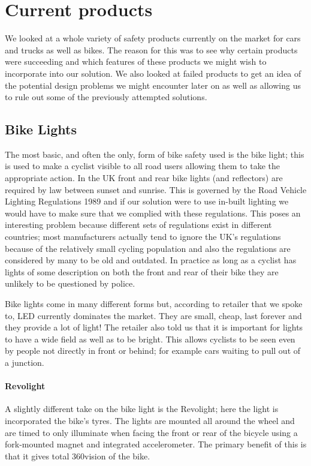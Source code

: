 \documentclass[a4paper]{report}
\begin{document}
{\section{Current products}
We looked at a whole variety of safety products currently on the market for cars and trucks as well as bikes. The reason for this was to see why certain products were succeeding and which features of these products we might wish to incorporate into our solution. We also looked at failed products to get an idea of the potential design problems we might encounter later on as well as allowing us to rule out some of the previously attempted solutions.
\subsection{Bike Lights}
The most basic, and often the only, form of bike safety used is the bike light; this is used to make a cyclist visible to all road users allowing them to take the appropriate action. In the UK front and rear bike lights (and reflectors) are required by law between sunset and sunrise. This is governed by the Road Vehicle Lighting Regulations 1989\cite{rvlr} and if our solution were to use in-built lighting we would have to make sure that we complied with these regulations. This poses an interesting problem because different sets of regulations exist in different countries; most manufacturers actually tend to ignore the UK's regulations because of the relatively small cycling population and also the regulations are considered by many to be old and outdated. In practice as long as a cyclist has lights of some description on both the front and rear of their bike they are unlikely to be questioned by police. 

Bike lights come in many different forms but, according to retailer that we spoke to, LED currently dominates the market. They are small, cheap, last forever and they provide a lot of light! The retailer also told us that it is important for lights to have a wide field as well as to be bright. This allows cyclists to be seen even by people not directly in front or behind; for example cars waiting to pull out of a junction.

\paragraph{Revolight} A slightly different take on the bike light is the Revolight\cite{revolight}; here the light is incorporated the bike's tyres. The lights are mounted all around the wheel and are timed to only illuminate when facing the front or rear of the bicycle using a fork-mounted magnet and integrated accelerometer. The primary benefit of this is that it gives total 360\degree vision of the bike.

}
\end{document}
